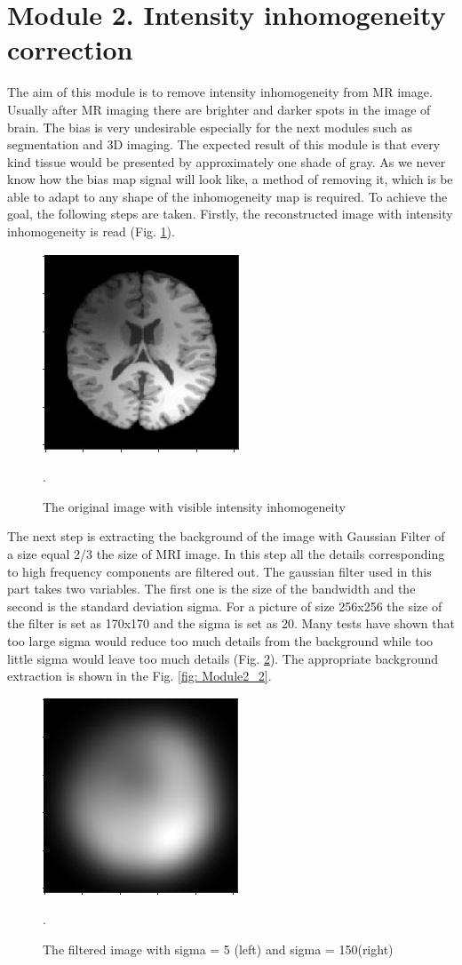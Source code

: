 \section{Module 2. Intensity inhomogeneity correction}
The aim of this module is to remove intensity inhomogeneity from MR image. Usually after MR imaging there are brighter and darker spots in the image of brain. The bias is very undesirable especially for the next modules such as segmentation and 3D imaging. The expected result of this module is that every kind tissue would be presented by approximately one shade of gray. As we never know how the bias map signal will look like, a method of removing it, which is be able to adapt to any shape of the inhomogeneity map is required. To achieve the goal, the following steps are taken. 
Firstly, the reconstructed image with intensity inhomogeneity is read (Fig. \ref{fig: Module2_1}).
\begin{figure}[H]
\centering{}\includegraphics[scale=1]{figures/Module_02/m2_3}\caption{The original image with visible intensity inhomogeneity}. 
\label{fig: Module2_1}
\end{figure}
The next step is extracting the background of the image with Gaussian Filter of a size equal 2/3 the size of MRI image. In this step all the details corresponding to high frequency components are filtered out. The gaussian filter used in this part takes two variables. The first one is the size of the bandwidth and the second is the standard deviation sigma. For a picture of size 256x256 the size of the filter is set as 170x170 and the sigma is set as 20. Many tests have shown that too large sigma would reduce too much details from the background while too little sigma would leave too much details (Fig. \ref{fig: Module2_5}). The appropriate background extraction is shown in the Fig. \ref{fig: Module2_2}. 
\begin{figure}[H]
\centering{}\includegraphics[scale=1]{figures/Module_02/m2_2}\caption{The filtered image with sigma = 5 (left) and sigma = 150(right)}. 
\label{fig: Module2_5}
\end{figure}
